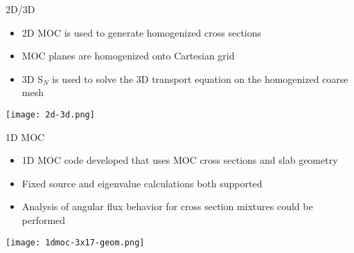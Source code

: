 
\begin{frame}
\begin{center}
\resizebox{0.5\textwidth}{!}{}
\end{center}
\end{frame}


\begin{frame}
\vspace{-10pt}
\begin{center}
\resizebox{0.4\textwidth}{!}{}
\end{center}
\end{frame}


\begin{frame}[t]{2D/3D}

\begin{itemize}
    \item 2D MOC is used to generate homogenized cross sections
    \item MOC planes are homogenized onto Cartesian grid
    \item 3D S$_N$ is used to solve the 3D transport equation on the homogenized coarse mesh
\end{itemize}
\begin{center}
    \texttt{[image: 2d-3d.png]}
\end{center}

\end{frame}


\begin{frame}[t]{1D MOC}

\begin{itemize}
    \item 1D MOC code developed that uses MOC cross sections and slab geometry
    \item Fixed source and eigenvalue calculations both supported
    \item Analysis of angular flux behavior for cross section mixtures could be performed
\end{itemize}
\begin{center}
    \texttt{[image: 1dmoc-3x17-geom.png]}
\end{center}

\end{frame}

